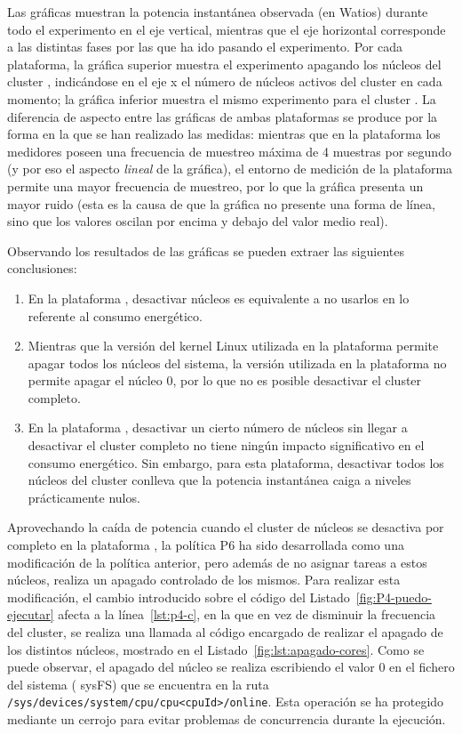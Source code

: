 Las gráficas muestran la potencia instantánea observada (en Watios) durante
todo el experimento en el eje vertical, mientras que el eje horizontal
corresponde a las distintas fases por las que ha ido pasando el
experimento. Por cada plataforma, la gráfica superior muestra el
experimento apagando los núcleos del cluster \BIG, indicándose en el eje x el
número de núcleos activos del cluster en cada momento; la gráfica inferior
muestra el mismo experimento para el cluster \LITTLE. La diferencia de
aspecto entre las gráficas de ambas plataformas se produce por la forma en
la que se han realizado las medidas: mientras que en la plataforma \odroid
los medidores poseen una frecuencia de muestreo máxima de 4 muestras por
segundo (y por eso el aspecto \emph{lineal} de la gráfica), el entorno de
medición de la plataforma \juno permite una mayor frecuencia de muestreo,
por lo que la gráfica presenta un mayor ruido (esta es la causa de que la
gráfica no presente una forma de línea, sino que los valores oscilan por
encima y debajo del valor medio real).

Observando los resultados de las gráficas se pueden extraer las siguientes
conclusiones:

\begin{enumerate}
\item En la plataforma \juno, desactivar núcleos es equivalente a no usarlos
  en lo referente al consumo energético.
\item Mientras que la versión del kernel Linux utilizada en la plataforma
  \juno permite apagar todos los núcleos del sistema, la versión utilizada en
  la plataforma \odroid no permite apagar el núcleo 0, por lo que no es
  posible desactivar el cluster \LITTLE completo.
\item En la plataforma \odroid, desactivar un cierto número de núcleos sin
  llegar a desactivar el cluster completo no tiene ningún impacto
  significativo en el consumo energético. Sin embargo, para esta
  plataforma, desactivar todos los núcleos del cluster \BIG conlleva que 
		la potencia instantánea caiga a niveles prácticamente nulos.
\end{enumerate}


Aprovechando la caída de potencia cuando el cluster de núcleos \BIG se
desactiva por completo en la plataforma \odroid, la política P6 ha sido
desarrollada como una modificación de la política anterior, pero además de
no asignar tareas a estos núcleos, realiza un apagado controlado de los
mismos. Para realizar esta modificación, el cambio introducido sobre el
código del Listado~\ref{fig:P4-puedo-ejecutar} afecta a la
línea~\ref{lst:p4-c}, en la que en vez de disminuir la frecuencia del
cluster, se realiza una llamada al código encargado de realizar el apagado
de los distintos núcleos, mostrado en el Listado~\ref{fig:lst:apagado-cores}. Como se puede observar, el apagado del
núcleo se realiza escribiendo el valor 0 en el fichero del sistema ({\sc
  sysFS}) que se encuentra en la ruta
\texttt{/sys/devices/system/cpu/cpu<cpuId>/online}. Esta operación se ha
protegido mediante un cerrojo para evitar problemas de concurrencia durante
la ejecución.



